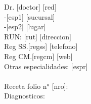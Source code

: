 \documentclass{article}
\begin{document}
\noindent Dr. [doctor]	\hfill \phantom	\hfill [red] \\
\noindent -[esp1]		\hfill \phantom	\hfill [sucursal] \\
\noindent -[esp2]	\hfill \phantom	\hfill [lugar] \\
\noindent RUN: [rut]	\hfill \phantom	\hfill [direccion] \\
\noindent Reg SS.[regss]	\hfill \phantom	\hfill [telefono] \\
\noindent Reg CM.[regcm]	\hfill \phantom	\hfill [web] \\
\noindent Otras especialidades: [espr] \\ \\

\noindent Receta folio n° [nro]: \hfill \phantom \hfill \\ 

\noindent Diagnosticos: \\ \\
\end{document}
